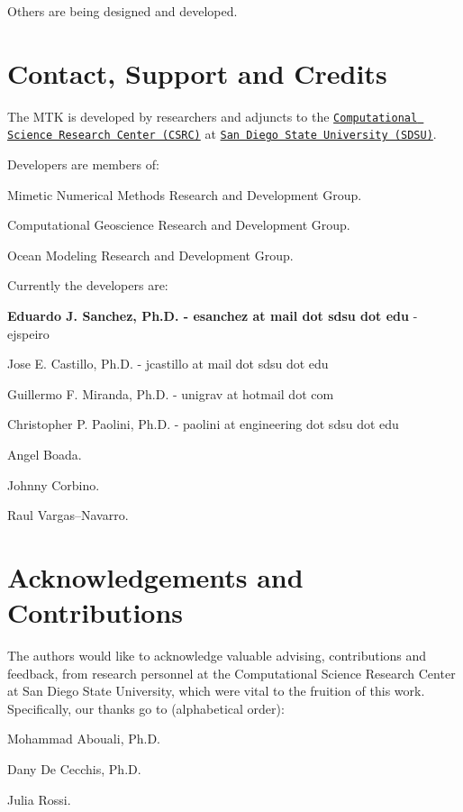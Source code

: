 Others are being designed and developed.\hypertarget{index_section_authors}{}\section{Contact, Support and Credits}\label{index_section_authors}
The M\+T\+K is developed by researchers and adjuncts to the \href{http://www.csrc.sdsu.edu/}{\tt Computational Science Research Center (C\+S\+R\+C)} at \href{http://www.sdsu.edu/}{\tt San Diego State University (S\+D\+S\+U)}.

Developers are members of\+:


\begin{DoxyEnumerate}
\item Mimetic Numerical Methods Research and Development Group.
\item Computational Geoscience Research and Development Group.
\item Ocean Modeling Research and Development Group.
\end{DoxyEnumerate}

Currently the developers are\+:


\begin{DoxyEnumerate}
\item {\bfseries Eduardo J. Sanchez, Ph.\+D. -\/ esanchez at mail dot sdsu dot edu} -\/ ejspeiro
\item Jose E. Castillo, Ph.\+D. -\/ jcastillo at mail dot sdsu dot edu
\item Guillermo F. Miranda, Ph.\+D. -\/ unigrav at hotmail dot com
\item Christopher P. Paolini, Ph.\+D. -\/ paolini at engineering dot sdsu dot edu
\item Angel Boada.
\item Johnny Corbino.
\item Raul Vargas--Navarro.
\end{DoxyEnumerate}\hypertarget{index_subsection_acknowledgements}{}\section{Acknowledgements and Contributions}\label{index_subsection_acknowledgements}
The authors would like to acknowledge valuable advising, contributions and feedback, from research personnel at the Computational Science Research Center at San Diego State University, which were vital to the fruition of this work. Specifically, our thanks go to (alphabetical order)\+:


\begin{DoxyEnumerate}
\item Mohammad Abouali, Ph.\+D.
\item Dany De Cecchis, Ph.\+D.
\item Julia Rossi. 
\end{DoxyEnumerate}